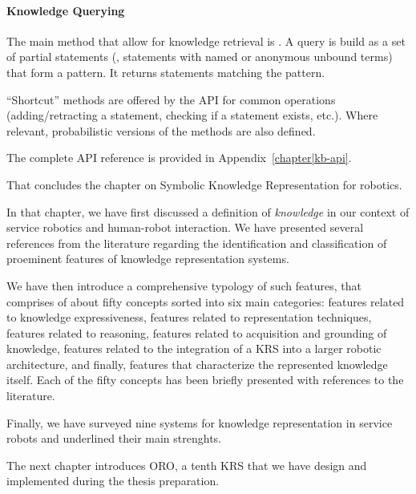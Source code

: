 \paragraph{Knowledge Querying} The main method that allow for knowledge
retrieval is . A  query is build as a set of partial
statements (\ie, statements with named or anonymous unbound terms) that form a
pattern. It returns statements matching the pattern.

``Shortcut'' methods are offered by the API for common operations
(adding/retracting a statement, checking if a statement exists, etc.). Where
relevant, probabilistic versions of the methods are also defined.

The complete API reference is provided in Appendix~\ref{chapter|kb-api}.


\clearpage

That concludes the chapter on Symbolic Knowledge Representation for robotics.

In that chapter, we have first discussed a definition of \emph{knowledge} in
our context of service robotics and human-robot interaction. We have presented
several references from the literature regarding the identification and
classification of proeminent features of knowledge representation systems. 

We have then introduce a comprehensive typology of such features, that
comprises of about fifty concepts sorted into six main categories: features
related to knowledge expressiveness, features related to representation
techniques, features related to reasoning, features related to acquisition and
grounding of knowledge, features related to the integration of a KRS into a
larger robotic architecture, and finally, features that characterize the
represented knowledge itself. Each of the fifty concepts has been briefly
presented with references to the literature.

Finally, we have surveyed nine systems for knowledge representation in service
robots and underlined their main strenghts.

The next chapter introduces ORO, a tenth KRS that we have design and
implemented during the thesis preparation.

